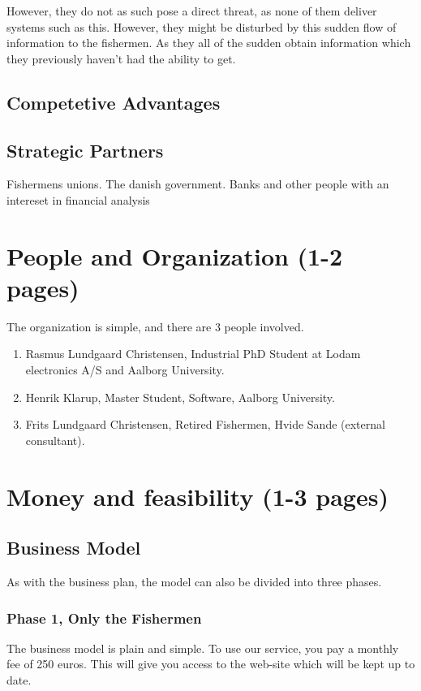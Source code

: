 \documentclass[a4paper,10pt,dateno,oneside,fleqn,sigleft]{newlfm} %
\begin{document}
\begin{newlfm}
However, they do not as such pose a direct threat, as none of them deliver systems such as this. However, they might be disturbed by this sudden flow of information to the fishermen. As they all of the sudden obtain information which they previously haven't had the ability to get. 



\subsection{Competetive Advantages}


\subsection{Strategic Partners}
Fishermens unions. 
The danish government.
Banks and other people with an intereset in financial analysis 

\section{People and Organization (1-2 pages)}
The organization is simple, and there are 3 people involved.
\begin{enumerate}
	\item Rasmus Lundgaard Christensen, Industrial PhD Student at Lodam electronics A/S and Aalborg University.
	\item Henrik Klarup, Master Student, Software, Aalborg University.
	\item Frits Lundgaard Christensen, Retired Fishermen, Hvide Sande (external consultant).
\end{enumerate}
 

\section{Money and feasibility (1-3 pages)}
\subsection{Business Model}
As with the business plan, the model can also be divided into three phases. 
\subsubsection{Phase 1, Only the Fishermen}
The business model is plain and simple. To use our service, you pay a monthly fee of 250 euros. This will give you access to the web-site which will be kept up to date. 


\end{newlfm}
\end{document}
